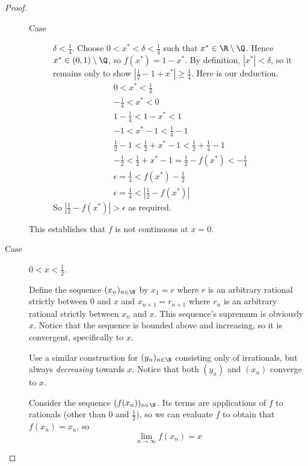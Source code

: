 \documentclass[letterpaper,11pt]{article}
\newcommand{\abs}[1]{\left|#1\right|}
\newcommand{\half}{\frac{1}{2}}
\newcommand{\quarter}{\frac{1}{4}}
\begin{document}
\begin{proof}
\begin{description}
\begin{description}
                \item[Case] $\delta < \quarter$.
                    Choose $0 < x^* < \delta < \quarter$
                    such that $x^* \in \R \setminus \Q$.
                    Hence $x^* \in (0, 1) \setminus \Q$,
                    so $f(x^*) = 1 - x^*$.
                    By definition, $|x^*| < \delta$,
                    so it remains only to show
                    $\abs{\half - 1 + x^*} \geq \quarter$.
                    Here is our deduction.
                    \begin{align*}
                        0 < x^* < \quarter \\
                        -\quarter < x^* < 0 \\
                        1 - \quarter < 1 - x^* < 1 \\
                        -1 < x^* - 1 < \quarter - 1 \\
                        \half - 1 < \half + x^* - 1 < \half + \quarter - 1 \\
                        -\half < \half + x^* - 1 = \half - f(x^*) < -\quarter \\
                        \epsilon = \quarter < f(x^*) - \half \\
                        \epsilon = \quarter < \abs{\half - f(x^*)}
                    \end{align*}
                    So $\abs{\half - f(x^*)} > \epsilon$ as required.
            \end{description}

            This establishes that $f$ is not continuous at $x = 0$.

        \item[Case] $0 < x < \half$.

            Define the sequence $(x_n)_{n\in\N}$ by $x_1 = r$ where $r$ is
            an arbitrary rational strictly between $0$ and $x$ and
            $x_{n+1} = r_{n+1}$ where $r_n$ is an arbitrary rational strictly
            between $x_n$ and $x$. This sequence's supremum is obviously $x$.
            Notice that the sequence is bounded above and increasing, so it is
            convergent, specifically to $x$.

            Use a similar construction for $(y_n)_{n\in\N}$ consisting only of
            irrationals, but always \emph{decreasing} towards $x$. Notice that
            both $(y_n)$ and $(x_n)$ converge to $x$.

            Consider the sequence $(f(x_n))_{n\in\N}$. Its terms are
            applications of $f$ to rationals (other than $0$ and $\half$), so
            we can evaluate $f$ to obtain that $f(x_n) = x_n$, so
            \begin{equation*}
                \lim_{n\to\infty} f(x_n) = x
            \end{equation*}


\end{description}
\end{proof}
\end{document}
